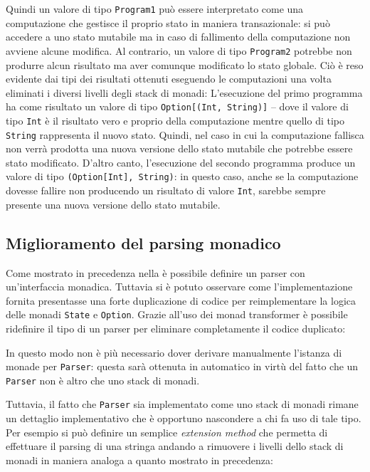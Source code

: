 Quindi un valore di tipo \lstinline{Program1} può essere interpretato come una computazione che gestisce il proprio stato in maniera transazionale: si può accedere a uno stato mutabile ma in caso di fallimento della computazione non avviene alcune modifica. Al contrario, un valore di tipo \lstinline{Program2} potrebbe non produrre alcun risultato ma aver comunque modificato lo stato globale. Ciò è reso evidente dai tipi dei risultati ottenuti eseguendo le computazioni una volta eliminati i diversi livelli degli stack di monadi:
L'esecuzione del primo programma ha come risultato un valore di tipo \lstinline{Option[(Int, String)]} -- dove il valore di tipo \lstinline{Int} è il risultato vero e proprio della computazione mentre quello di tipo \lstinline{String} rappresenta il nuovo stato. Quindi, nel caso in cui la computazione fallisca non verrà prodotta una nuova versione dello stato mutabile che potrebbe essere stato modificato.
D'altro canto, l'esecuzione del secondo programma produce un valore di tipo \lstinline{(Option[Int], String)}: in questo caso, anche se la computazione dovesse fallire non producendo un risultato di valore \lstinline{Int}, sarebbe sempre presente una nuova versione dello stato mutabile.

\subsection{Miglioramento del parsing monadico}
Come mostrato in precedenza nella  è possibile definire un parser con un'interfaccia monadica. Tuttavia si è potuto osservare come l'implementazione fornita presentasse una forte duplicazione di codice per reimplementare la logica delle monadi \lstinline{State} e \lstinline{Option}.
Grazie all'uso dei monad transformer è possibile ridefinire il tipo di un parser per eliminare completamente il codice duplicato:

In questo modo non è più necessario dover derivare manualmente l'istanza di monade per \lstinline{Parser}: questa sarà ottenuta in automatico in virtù del fatto che un \lstinline{Parser} non è altro che uno stack di monadi.

Tuttavia, il fatto che \lstinline{Parser} sia implementato come uno stack di monadi rimane un dettaglio implementativo che è opportuno nascondere a chi fa uso di tale tipo. Per esempio si può definire un semplice \emph{extension method} che permetta di effettuare il parsing di una stringa andando a rimuovere i livelli dello stack di monadi in maniera analoga a quanto mostrato in precedenza:

